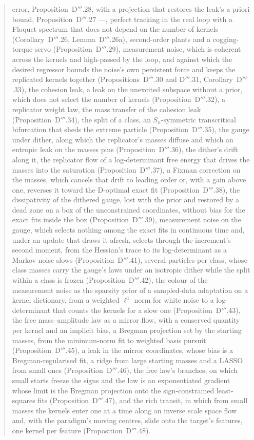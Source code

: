\begin{abstract}
error, Proposition~D$'''$.28, with a projection that restores the leak's a-priori bound, Proposition~D$'''$.27 ---,
perfect tracking in the real loop with a Floquet spectrum that does not depend on the number of kernels
(Corollary~D$'''$.26, Lemma~D$'''$.26a), second-order plants and a cogging-torque servo (Proposition~D$'''$.29),
measurement noise, which is coherent across the kernels and high-passed by the loop, and against which the desired
regressor bounds the noise's own persistent force and keeps the replicated kernels together
(Propositions~D$'''$.30 and D$'''$.31, Corollary~D$'''$.33), the cohesion leak, a leak on the unexcited subspace
without a prior, which does not select the number of kernels (Proposition~D$'''$.32), a replicator weight law,
the mass transfer of the cohesion leak (Proposition~D$'''$.34), the split of a class, an $S_n$-symmetric
transcritical bifurcation that sheds the extreme particle (Proposition~D$'''$.35), the gauge under dither, along
which the replicator's masses diffuse and which an entropic leak on the masses pins (Proposition~D$'''$.36), the
dither's drift along it, the replicator flow of a log-determinant free energy that drives the masses into the
saturation (Proposition~D$'''$.37), a Fixman correction on the masses, which cancels that drift to leading order or,
with a gain above one, reverses it toward the D-optimal exact fit (Proposition~D$'''$.38), the dissipativity of the
dithered gauge, lost with the prior and restored by a dead zone on a box of the unconstrained coordinates, without bias
for the exact fits inside the box (Proposition~D$'''$.39), measurement noise on the gauge, which selects nothing among
the exact fits in continuous time and, under an update that draws it afresh, selects through the increment's second
moment, from the Hessian's trace to its log-determinant as a Markov noise slows (Proposition~D$'''$.41), several
particles per class, whose class masses carry the gauge's laws under an isotropic dither while the split within a class
is frozen (Proposition~D$'''$.42), the colour of the measurement noise as the sparsity prior of a sampled-data
adaptation on a kernel dictionary, from a weighted $\ell^1$ norm for white noise to a log-determinant that counts the
kernels for a slow one (Proposition~D$'''$.43), the free mass--amplitude law as a mirror flow, with a conserved quantity
per kernel and an implicit bias, a Bregman projection set by the starting masses, from the minimum-norm fit to weighted
basis pursuit (Proposition~D$'''$.45), a leak in the mirror coordinates, whose bias is a Bregman-regularised fit, a ridge
from large starting masses and a LASSO from small ones (Proposition~D$'''$.46), the free law's branches, on which small
starts freeze the signs and the law is an exponentiated gradient whose limit is the Bregman projection onto the
sign-constrained least-squares fits (Proposition~D$'''$.47), and the rich transit, in which from small masses the kernels
enter one at a time along an inverse scale space flow and, with the paradigm's moving centres, slide onto the target's
features, one kernel per feature (Proposition~D$'''$.48).
\end{abstract}
